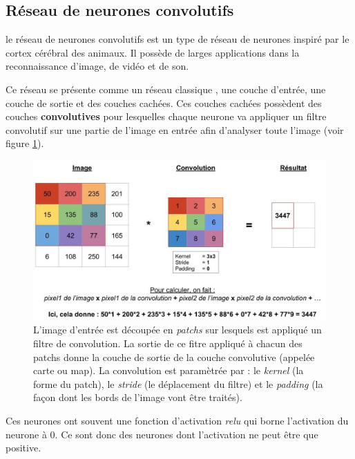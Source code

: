 \hypertarget{Ruxe9seau-de-neurones-convolutif}{%
\subsection{Réseau de neurones convolutifs}
\label{Ruxe9seau-de-neurones-convolutif}}

le réseau de neurones convolutifs est un type de réseau de neurones
inspiré par le cortex cérébral des animaux.
Il possède de larges applications dans la reconnaissance d'image, de vidéo et de son.

Ce réseau se présente comme un réseau classique , une couche d'entrée,
une couche de sortie et des couches cachées.
Ces couches cachées possèdent des couches \textbf{convolutives}
pour lesquelles chaque neurone va appliquer un filtre convolutif
sur une partie de l'image en entrée afin d'analyser toute l'image
(voir figure \ref{fig:explication_convolution}).

\begin{figure}[h!]
\begin{center}
\centering
\includegraphics[width=15cm]{./images/explication_convolution.jpg}
\caption[Schéma de la convolution.]{L'image d'entrée est découpée en \textit{patchs}
sur lesquels est appliqué un filtre de convolution.
La sortie de ce fitre appliqué à chacun des patchs donne la couche de sortie
de la couche convolutive (appelée carte ou map).
La convolution est paramètrée par : le \textit{kernel} (la forme du patch),
le \textit{stride} (le déplacement du filtre) et le \textit{padding}
 (la façon dont les bords de l'image vont être traités).\label{fig:explication_convolution}}
\end{center}
\end{figure}

Ces neurones ont souvent une fonction d'activation \textit{relu}
qui borne l'activation du neurone à 0. Ce sont donc des neurones
dont l'activation ne peut être que positive.

